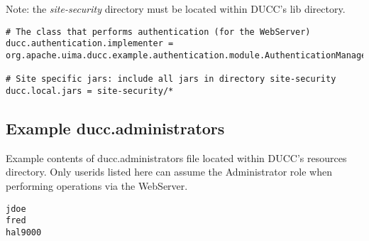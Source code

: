     Note: the {\em site-security} directory must be located within DUCC's lib
    directory.
    
    \begin{verbatim}
# The class that performs authentication (for the WebServer)
ducc.authentication.implementer = org.apache.uima.ducc.example.authentication.module.AuthenticationManager

# Site specific jars: include all jars in directory site-security
ducc.local.jars = site-security/*
    \end{verbatim}
    
\subsection{Example ducc.administrators}
    
    Example contents of ducc.administrators file located within DUCC's resources
    directory. Only userids listed here can assume the Administrator role when 
    performing operations via the WebServer.
    
    \begin{verbatim}
jdoe
fred
hal9000
    \end{verbatim}


  
